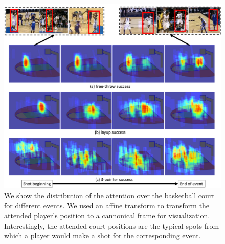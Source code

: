 \begin{figure}[t!]
\begin{center}
  \includegraphics[width=7in]{images/heatmap_figure_v2_cropped.pdf}
\end{center}
   \caption{We show the distribution of the attention over the basketball court
     for different events. We used an affine transform to transform the
     attended player's position to a cannonical frame for visualization.
     Interestingly, the attended court positions are the typical spots from
     which a player would make a shot for the corresponding event.
   }
\label{fig:att_heatmap}
\end{figure}

